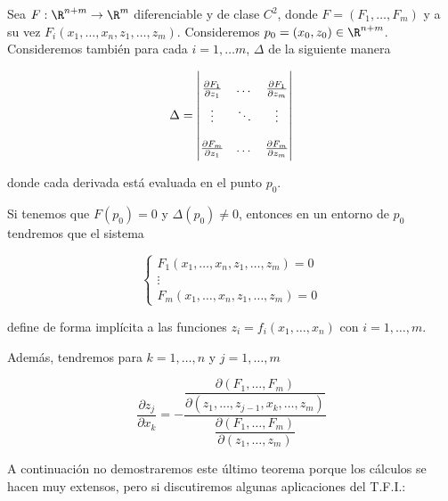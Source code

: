 
\begin{teo}
    Sea $F: \R^{n+m} \rightarrow \R^m$ diferenciable y de clase $C^2$, donde $F = (F_1, \dots, F_m)$ y a su vez $F_i(x_1, \dots, x_n, z_1, \dots, z_m)$. Consideremos $p_0 = (x_0, z_0) \in \R^{n+m}$. Consideremos también para cada $i = 1, \dots m$, $\Delta$ de la siguiente manera
    
    \[
    \Delta =
    \renewcommand\arraystretch{2}
    \begin{vmatrix}
        \frac{\partial F_1}{\partial z_1} & \dots & \frac{\partial F_1}{\partial z_m} \\
        \vdots & \ddots & \vdots \\
        \frac{\partial F_m}{\partial z_1} & \dots & \frac{\partial F_m}{\partial z_m}
    \end{vmatrix}
    \]
    
    \noindent donde cada derivada está evaluada en el punto $p_0$.
    
    Si tenemos que $F(p_0) = 0$ y $\Delta(p_0) \neq 0$, entonces en un entorno de $p_0$ tendremos que el sistema
    
    \[
    \begin{cases}
        F_1(x_1, \dots, x_n, z_1, \dots, z_m) = 0 \\
        \vdots \\
        F_m(x_1, \dots, x_n, z_1, \dots, z_m) = 0
    \end{cases}
    \]
    
    \noindent define de forma implícita a las funciones $z_i = f_i(x_1, \dots, x_n)$ con $i = 1, \dots, m$.
    
    Además, tendremos para $k = 1, \dots, n$ y $j = 1, \dots, m$
    
    \[
    \dfrac{\partial z_j}{\partial x_k} = -\dfrac{\dfrac{\partial(F_1, \dots, F_m)}{\partial(z_1, \dots, z_{j-1}, x_k, \dots, z_m)}}{\dfrac{\partial(F_1, \dots, F_m)}{\partial(z_1, \dots, z_m)}}
    \]
\end{teo}

A continuación no demostraremos este último teorema porque los cálculos se hacen muy extensos, pero si discutiremos algunas aplicaciones del T.F.I.:

